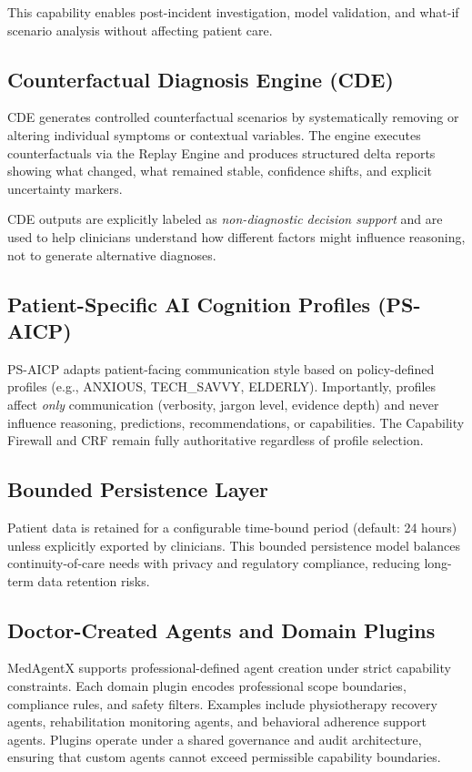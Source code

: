 \documentclass[conference]{IEEEtran}
\begin{document}
This capability enables post-incident investigation, model validation, and what-if scenario analysis without affecting patient care.

\subsection{Counterfactual Diagnosis Engine (CDE)}
CDE generates controlled counterfactual scenarios by systematically removing or altering individual symptoms or contextual variables. The engine executes counterfactuals via the Replay Engine and produces structured delta reports showing what changed, what remained stable, confidence shifts, and explicit uncertainty markers.

CDE outputs are explicitly labeled as \textit{non-diagnostic decision support} and are used to help clinicians understand how different factors might influence reasoning, not to generate alternative diagnoses.

\subsection{Patient-Specific AI Cognition Profiles (PS-AICP)}
PS-AICP adapts patient-facing communication style based on policy-defined profiles (e.g., ANXIOUS, TECH\_SAVVY, ELDERLY). Importantly, profiles affect \textit{only} communication (verbosity, jargon level, evidence depth) and never influence reasoning, predictions, recommendations, or capabilities. The Capability Firewall and CRF remain fully authoritative regardless of profile selection.

\subsection{Bounded Persistence Layer}
Patient data is retained for a configurable time-bound period (default: 24 hours) unless explicitly exported by clinicians. This bounded persistence model balances continuity-of-care needs with privacy and regulatory compliance, reducing long-term data retention risks.

\subsection{Doctor-Created Agents and Domain Plugins}
MedAgentX supports professional-defined agent creation under strict capability constraints. Each domain plugin encodes professional scope boundaries, compliance rules, and safety filters. Examples include physiotherapy recovery agents, rehabilitation monitoring agents, and behavioral adherence support agents. Plugins operate under a shared governance and audit architecture, ensuring that custom agents cannot exceed permissible capability boundaries.
\end{document}
